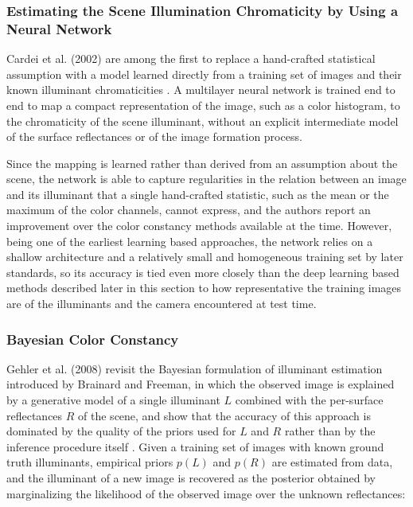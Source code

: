 \subsubsection{Estimating the Scene Illumination Chromaticity by Using a Neural Network}

Cardei et al. (2002) are among the first to replace a hand-crafted statistical assumption with a model learned directly from a training set of images and their known illuminant chromaticities \cite{cardeiIlluminationNeuralNetwork}. A multilayer neural network is trained end to end to map a compact representation of the image, such as a color histogram, to the chromaticity of the scene illuminant, without an explicit intermediate model of the surface reflectances or of the image formation process.

Since the mapping is learned rather than derived from an assumption about the scene, the network is able to capture regularities in the relation between an image and its illuminant that a single hand-crafted statistic, such as the mean or the maximum of the color channels, cannot express, and the authors report an improvement over the color constancy methods available at the time. However, being one of the earliest learning based approaches, the network relies on a shallow architecture and a relatively small and homogeneous training set by later standards, so its accuracy is tied even more closely than the deep learning based methods described later in this section to how representative the training images are of the illuminants and the camera encountered at test time.

\subsubsection{Bayesian Color Constancy}

Gehler et al. (2008) revisit the Bayesian formulation of illuminant estimation introduced by Brainard and Freeman, in which the observed image is explained by a generative model of a single illuminant $L$ combined with the per-surface reflectances $R$ of the scene, and show that the accuracy of this approach is dominated by the quality of the priors used for $L$ and $R$ rather than by the inference procedure itself \cite{gehler2008bayesian}. Given a training set of images with known ground truth illuminants, empirical priors $p(L)$ and $p(R)$ are estimated from data, and the illuminant of a new image is recovered as the posterior obtained by marginalizing the likelihood of the observed image over the unknown reflectances:

